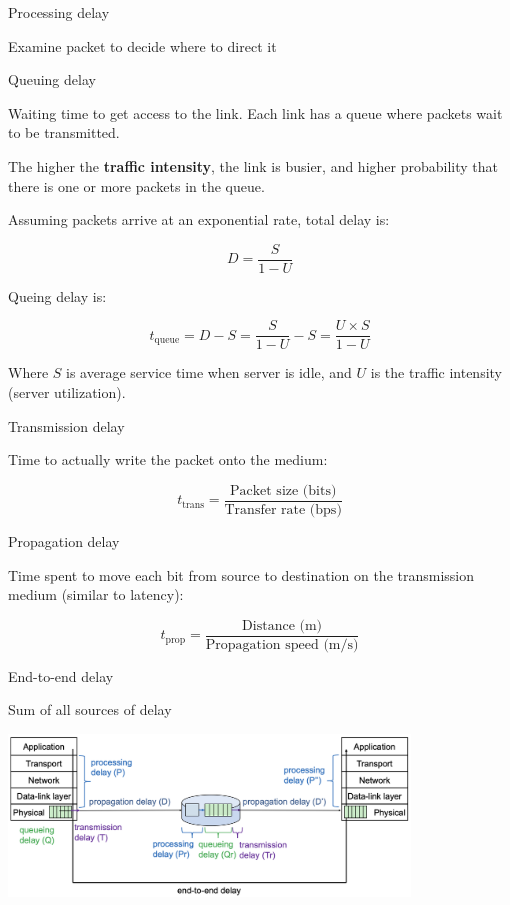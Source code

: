 \begin{knBox}
    {Processing delay}

    Examine packet to decide where to direct it
\end{knBox}

\begin{knBox}
    {Queuing delay}

    Waiting time to get access to the link. Each link has a queue where packets wait to be transmitted.

    The higher the \textbf{traffic intensity}, the link is busier, and higher probability that there is one or more packets in the queue.

    Assuming packets arrive at an exponential rate, total delay is:

    \[D = \frac{S}{1-U}\]

    Queing delay is:

    \[t_{\text{queue}} = D - S = \frac{S}{1-U} - S = \frac{U \times S}{1-U}\]

    Where $S$ is average service time when server is idle, and $U$ is the traffic intensity (server utilization).
\end{knBox}

\begin{knBox}
    {Transmission delay}

    Time to actually write the packet onto the medium:

    \[t_{\text{trans}} = \frac{\text{Packet size (bits)}}{\text{Transfer rate (bps)}}\]
\end{knBox}

\begin{knBox}
    {Propagation delay}

    Time spent to move each bit from source to destination on the transmission medium (similar to latency):

    \[t_{\text{prop}} = \frac{\text{Distance (m)}}{\text{Propagation speed (m/s)}}\]
\end{knBox}

\begin{knBox}
    {End-to-end delay}

    Sum of all sources of delay
\end{knBox}

\begin{center}
    \includegraphics[width=0.8\textwidth]{./images/m02-l02-1.png}
\end{center}